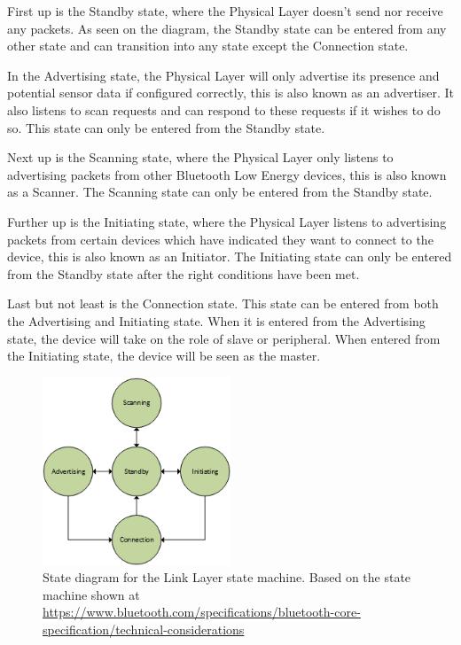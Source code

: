 \documentclass[pdftex,a4paper,12pt,twoside]{report}
\begin{document}
First up is the Standby state, where the Physical Layer doesn't send nor receive any packets. As seen on the diagram, the Standby state can be entered from any other state and can transition into any state except the Connection state.

In the Advertising state, the Physical Layer will only advertise its presence and potential sensor data if configured correctly, this is also known as an advertiser. It also listens to scan requests and can respond to these requests if it wishes to do so. This state can only be entered from the Standby state.

Next up is the Scanning state, where the Physical Layer only listens to advertising packets from other Bluetooth Low Energy devices, this is also known as a Scanner. The Scanning state can only be entered from the Standby state.

Further up is the Initiating state, where the Physical Layer listens to advertising packets from certain devices which have indicated they want to connect to the device, this is also known as an Initiator. The Initiating state can only be entered from the Standby state after the right conditions have been met.

Last but not least is the Connection state. This state can be entered from both the Advertising and Initiating state. When it is entered from the Advertising state, the device will take on the role of slave or peripheral. When entered from the Initiating state, the device will be seen as the master.

\begin{figure}[h]
    \centering
    \includegraphics[width=0.5\textwidth]{img/llstate.png}
    \caption[State diagram for the Link Layer state machine]{State diagram for the Link Layer state machine. Based on the state machine shown at \url{https://www.bluetooth.com/specifications/bluetooth-core-specification/technical-considerations}}
    \label{fig:llstatemachine}
\end{figure}
\end{document}
